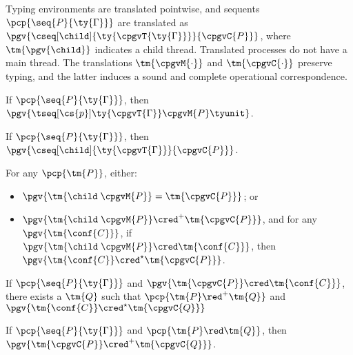 Typing environments are translated pointwise, and sequents $\pcp{\seq{P}{\ty{\Gamma}}}$ are translated as $\pgv{\cseq[\child]{\ty{\cpgvT{\ty{\Gamma}}}}{\cpgvC{P}}}$, where $\tm{\pgv{\child}}$ indicates a child thread. Translated processes do not have a main thread.
The translations $\tm{\cpgvM{\cdot}}$ and $\tm{\cpgvC{\cdot}}$ preserve typing, and the latter induces a sound and complete operational correspondence.
\begin{lem}\label{lem:pcp-to-pgv-terms-preservation}
  If $\pcp{\seq{P}{\ty{\Gamma}}}$, then $\pgv{\tseq[\cs{p}]{\ty{\cpgvT{\Gamma}}}{\cpgvM{P}}{\tyunit}}$.
\end{lem}
\begin{thm}\label{thm:pcp-to-pgv-confs-preservation}
  If $\pcp{\seq{P}{\ty{\Gamma}}}$, then $\pgv{\cseq[\child]{\ty{\cpgvT{\Gamma}}}{\cpgvC{P}}}$.
\end{thm}
\begin{lem}\label{lem:pcp-to-pgv-cpgvM-to-cpgvC}
  For any $\pcp{\tm{P}}$, either:
  \begin{itemize}
    \item $\pgv{\tm{\child\;\cpgvM{P}}=\tm{\cpgvC{P}}}$; or
    \item $\pgv{\tm{\child\;\cpgvM{P}}\cred^+\tm{\cpgvC{P}}}$, and for any $\pgv{\tm{\conf{C}}}$, if $\pgv{\tm{\child\;\cpgvM{P}}\cred\tm{\conf{C}}}$, then $\pgv{\tm{\conf{C}}\cred^\star\tm{\cpgvC{P}}}$.
  \end{itemize}
\end{lem}
\begin{thm}\label{thm:pcp-to-pgv-operational-correspondence-soundness}
  If $\pcp{\seq{P}{\ty{\Gamma}}}$ and $\pgv{\tm{\cpgvC{P}}\cred\tm{\conf{C}}}$, there exists a $\tm{Q}$ such that $\pcp{\tm{P}\red^+\tm{Q}}$ and $\pgv{\tm{\conf{C}}\cred^\star\tm{\cpgvC{Q}}}$
\end{thm}
\begin{thm}\label{thm:pcp-to-pgv-operational-correspondence-completeness}
  If $\pcp{\seq{P}{\ty{\Gamma}}}$ and $\pcp{\tm{P}\red\tm{Q}}$,
  then $\pgv{\tm{\cpgvC{P}}\cred^+\tm{\cpgvC{Q}}}$.
\end{thm}
\endgroup
